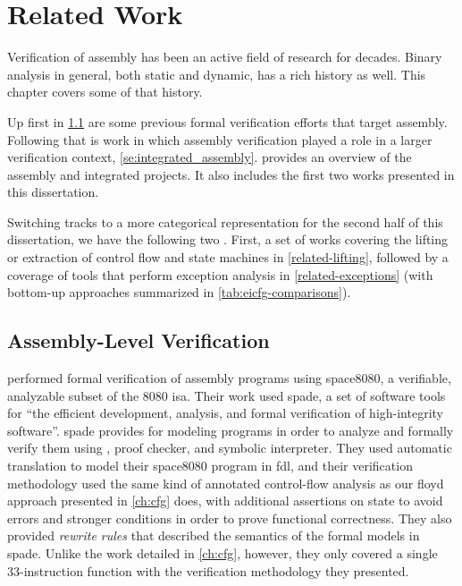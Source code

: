 \chapter{Related Work}\label{ch:related}
Verification of assembly has been an active field of research for decades.
Binary analysis in general, both static and dynamic, has a rich history as well.
This chapter covers some of that history.

Up first in \cref{se:previous_assembly}
are some previous formal verification efforts that target assembly.
Following that is work in which assembly verification played a role
in a larger verification context, \cref{se:integrated_assembly}.
 provides an overview of the assembly
and integrated projects.
It also includes the first two works presented in this dissertation.

Switching tracks to a more categorical representation for the second half of this dissertation, we have the following two .
First, a set of works covering the lifting or extraction of control flow and state machines in \cref{related-lifting}, followed by a coverage of tools that perform exception analysis in \cref{related-exceptions} (with bottom-up approaches summarized in \cref{tab:eicfg-comparisons}).

\section{Assembly-Level Verification}\label{se:previous_assembly}
\Textcite{clutterbuck1986validation,clutterbuck1988verification} performed formal verification
of assembly programs using \gls{space8080}, a verifiable,
analyzable subset of the \gls{8080} \ac{isa}.
Their work used \ac{spade}, %
a set of software tools for ``the efficient development, analysis, and formal verification of high-integrity software''.
\Ac{spade} provides  for modeling programs
in order to analyze and formally verify them
using , proof checker, and symbolic interpreter.
They used automatic translation to model their \gls{space8080} program
in \ac{fdl}, and their verification methodology used the same kind of
annotated control-flow analysis as our \gls{floyd} approach
presented in \cref{ch:cfg} does, with additional assertions on state to avoid errors
and stronger conditions in order to prove functional correctness.
They also provided \emph{rewrite rules} that described the semantics
of the formal models in \ac{spade}. Unlike the work detailed in \cref{ch:cfg}, however,
they only covered a single 33-instruction function
with the verification methodology they presented.

